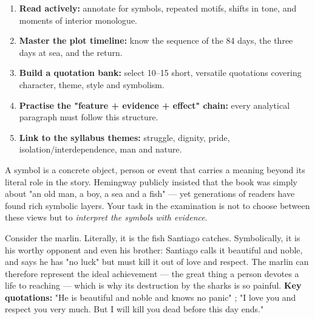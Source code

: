 \documentclass[11pt]{article}
\newcommand{\cle}[1]{{\popxbold\color{popdark}#1}}
\newcounter{popsec}
\newcounter{popsub}
\newcommand{\courssub}[1]{%
  \stepcounter{popsub}%
  \par\vspace{9pt}\noindent{\popxbold\fontsize{11.5}{13}\selectfont\color{popink}{\color{poporange}\thepopsec.\thepopsub}\hspace{6pt}#1}\par\nopagebreak\vspace{4pt}
}
\begin{document}
\begin{methode}
\begin{enumerate}
\item \textbf{Read actively:} annotate for symbols, repeated motifs, shifts in tone, and moments of interior monologue.
\item \textbf{Master the plot timeline:} know the sequence of the 84 days, the three days at sea, and the return.
\item \textbf{Build a quotation bank:} select 10--15 short, versatile quotations covering character, theme, style and symbolism.
\item \textbf{Practise the "feature + evidence + effect" chain:} every analytical paragraph must follow this structure.
\item \textbf{Link to the syllabus themes:} struggle, dignity, pride, isolation/interdependence, man and nature.
\end{enumerate}
\end{methode}

\courssub{Symbolism in the Novella}

A \cle{symbol} is a concrete object, person or event that carries a meaning beyond its literal role in the story. Hemingway publicly insisted that the book was simply about "an old man, a boy, a sea and a fish" — yet generations of readers have found rich symbolic layers. Your task in the examination is not to choose between these views but to \emph{interpret the symbols with evidence}.

\begin{exemplebox}
Consider the \cle{marlin}. Literally, it is the fish Santiago catches. Symbolically, it is his worthy opponent and even his brother: Santiago calls it beautiful and noble, and says he has "no luck" but must kill it out of love and respect. The marlin can therefore represent the ideal achievement — the great thing a person devotes a life to reaching — which is why its destruction by the sharks is so painful. \textbf{Key quotations:} "He is beautiful and noble and knows no panic" ; "I love you and respect you very much. But I will kill you dead before this day ends."
\end{exemplebox}
\end{document}
